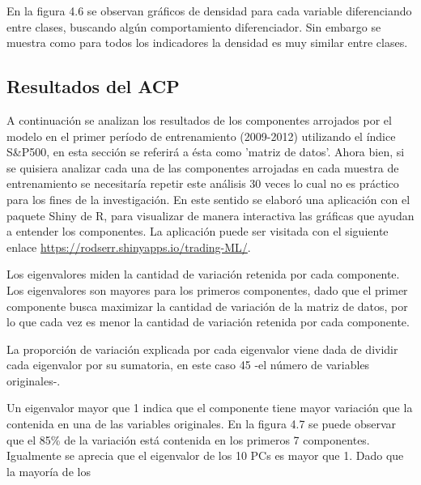 \documentclass[a4paper,12pt]{Latex/Classes/PhDthesisPSnPDF}
\begin{document}
En la figura 4.6 se observan gráficos de densidad para cada variable diferenciando entre clases, buscando algún comportamiento diferenciador. Sin embargo se muestra como para todos los indicadores la densidad es muy similar entre clases.

\subsection{Resultados del ACP}

A continuación se analizan los resultados de los componentes arrojados por el modelo en el primer período de entrenamiento (2009-2012) utilizando el índice S\&P500, en esta sección se referirá a ésta como 'matriz de datos'. Ahora bien, si se quisiera analizar cada una de las componentes arrojadas en cada muestra de entrenamiento se necesitaría repetir este análisis 30 veces lo cual no es práctico para los fines de la investigación. En este sentido se elaboró una aplicación con el paquete Shiny de R, para visualizar de manera interactiva las gráficas que ayudan a entender los componentes. La aplicación puede ser visitada con el siguiente enlace \url{https://rodserr.shinyapps.io/trading-ML/}.


Los eigenvalores miden la cantidad de variación retenida por cada componente. Los eigenvalores son mayores para los primeros componentes, dado que el primer componente busca maximizar la cantidad de variación de la matriz de datos, por lo que cada vez es menor la cantidad de variación retenida por cada componente.

La proporción de variación explicada por cada eigenvalor viene dada de dividir cada eigenvalor por su sumatoria, en este caso 45 -el número de variables originales-.

Un eigenvalor mayor que 1 indica que el componente tiene mayor variación que la contenida en una de las variables originales. En la figura 4.7 se puede observar que el 85\% de la variación está contenida en los primeros 7 componentes. Igualmente se aprecia que el eigenvalor de los 10 PCs es mayor que 1. Dado que la mayoría de los 
\end{document}
